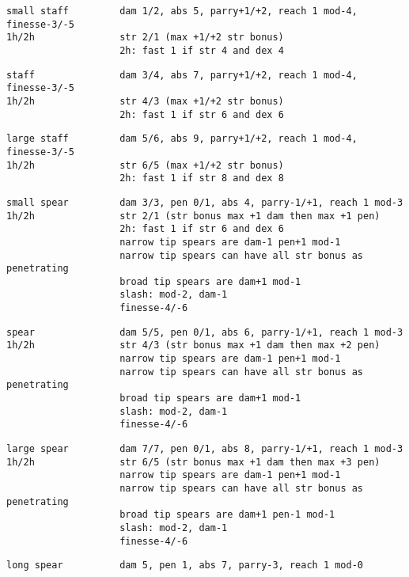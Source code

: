 \begin{samepage}
\begin{verbatim}
small staff         dam 1/2, abs 5, parry+1/+2, reach 1 mod-4, finesse-3/-5
1h/2h               str 2/1 (max +1/+2 str bonus)
                    2h: fast 1 if str 4 and dex 4
\end{verbatim} \blocklistgap \begin{verbatim}
staff               dam 3/4, abs 7, parry+1/+2, reach 1 mod-4, finesse-3/-5
1h/2h               str 4/3 (max +1/+2 str bonus)
                    2h: fast 1 if str 6 and dex 6
\end{verbatim} \blocklistgap \begin{verbatim}
large staff         dam 5/6, abs 9, parry+1/+2, reach 1 mod-4, finesse-3/-5
1h/2h               str 6/5 (max +1/+2 str bonus)
                    2h: fast 1 if str 8 and dex 8
\end{verbatim} \blocklistgap \begin{verbatim}
small spear         dam 3/3, pen 0/1, abs 4, parry-1/+1, reach 1 mod-3
1h/2h               str 2/1 (str bonus max +1 dam then max +1 pen)
                    2h: fast 1 if str 6 and dex 6
                    narrow tip spears are dam-1 pen+1 mod-1
                    narrow tip spears can have all str bonus as penetrating
                    broad tip spears are dam+1 mod-1
                    slash: mod-2, dam-1
                    finesse-4/-6
\end{verbatim} \blocklistgap \begin{verbatim}
spear               dam 5/5, pen 0/1, abs 6, parry-1/+1, reach 1 mod-3
1h/2h               str 4/3 (str bonus max +1 dam then max +2 pen)
                    narrow tip spears are dam-1 pen+1 mod-1
                    narrow tip spears can have all str bonus as penetrating
                    broad tip spears are dam+1 mod-1
                    slash: mod-2, dam-1
                    finesse-4/-6
\end{verbatim} \blocklistgap \begin{verbatim}
large spear         dam 7/7, pen 0/1, abs 8, parry-1/+1, reach 1 mod-3
1h/2h               str 6/5 (str bonus max +1 dam then max +3 pen)
                    narrow tip spears are dam-1 pen+1 mod-1
                    narrow tip spears can have all str bonus as penetrating
                    broad tip spears are dam+1 pen-1 mod-1
                    slash: mod-2, dam-1
                    finesse-4/-6
\end{verbatim} \blocklistgap \begin{verbatim}
long spear          dam 5, pen 1, abs 7, parry-3, reach 1 mod-0

\end{verbatim}
\end{samepage}
